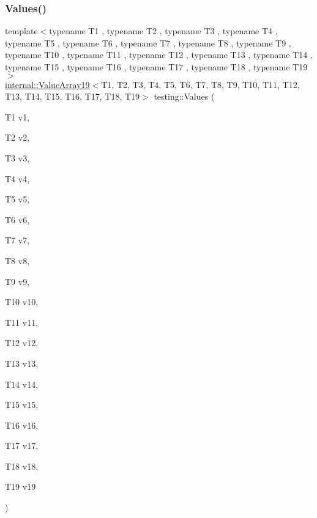 \subsubsection{\texorpdfstring{Values()}{Values()}\hspace{0.1cm}{\footnotesize\ttfamily [20/51]}}
{\footnotesize\ttfamily template$<$typename T1 , typename T2 , typename T3 , typename T4 , typename T5 , typename T6 , typename T7 , typename T8 , typename T9 , typename T10 , typename T11 , typename T12 , typename T13 , typename T14 , typename T15 , typename T16 , typename T17 , typename T18 , typename T19 $>$ \\
\mbox{\hyperlink{classtesting_1_1internal_1_1_value_array19}{internal\+::\+Value\+Array19}}$<$T1, T2, T3, T4, T5, T6, T7, T8, T9, T10, T11, T12, T13, T14, T15, T16, T17, T18, T19$>$ testing\+::\+Values (\begin{DoxyParamCaption}\item[{T1}]{v1,  }\item[{T2}]{v2,  }\item[{T3}]{v3,  }\item[{T4}]{v4,  }\item[{T5}]{v5,  }\item[{T6}]{v6,  }\item[{T7}]{v7,  }\item[{T8}]{v8,  }\item[{T9}]{v9,  }\item[{T10}]{v10,  }\item[{T11}]{v11,  }\item[{T12}]{v12,  }\item[{T13}]{v13,  }\item[{T14}]{v14,  }\item[{T15}]{v15,  }\item[{T16}]{v16,  }\item[{T17}]{v17,  }\item[{T18}]{v18,  }\item[{T19}]{v19 }\end{DoxyParamCaption})}

\mbox{\label{namespacetesting_aedd2f90dfb3c42dce713ba0b89cde96c}} 
